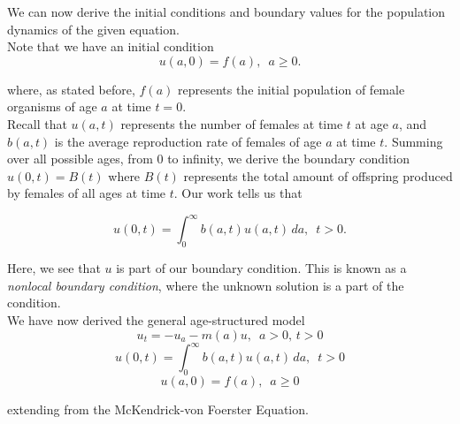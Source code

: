We can now derive the initial conditions and boundary values for the population dynamics of the given equation. \\

Note that we have an initial condition 
\[u(a, 0)=f(a), \, \, \, a \geq 0.\]

where, as stated before, $f(a)$ represents the initial population of female organisms of age $a$ at time $t=0.$ \\

Recall that $u(a, t) $ represents the number of females at time $t$ at age $a$, and $b(a, t)$ is the average reproduction rate of females of age $a$ at time $t.$ Summing over all possible ages, from $0$ to infinity, we derive the boundary condition $u(0,t) = B(t)$ where $B(t)$ represents the total amount of offspring produced by females of all ages at time $t$. Our work tells us that

\[ u(0,t) = \int_0^{\infty}b(a,t)u(a, t) \, da, \, \, \, t>0.\]

Here, we see that $u$ is part of our boundary condition. This is known as a \emph{nonlocal boundary condition}, where the unknown solution is a part of the condition. \\

We have now derived the general age-structured model
\[ u_t = -u_a-m(a)u, \, \, \, a>0, \, t>0\]
\[ u(0,t) = \int_0^{\infty}b(a,t)u(a, t) \, da, \, \, \, t>0\]
\[ u(a, 0)=f(a), \, \, \, a \geq 0\]

extending from the McKendrick-von Foerster Equation. 

